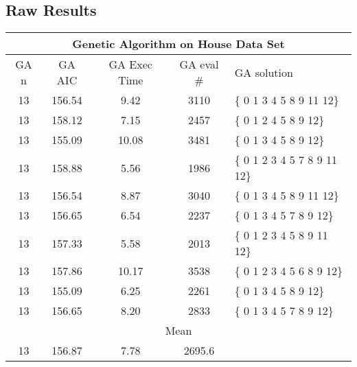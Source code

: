 \subsection{Raw Results}
\label{rawResHouse}
\begin{tabular}{|c|c|c|c|l|}
	\hline
	\multicolumn{5}{|c|}{Genetic Algorithm on House Data Set}                                     \\ \hline
	GA n & GA AIC      & GA Exec Time & GA eval \# & GA solution                  \\ \hline
	13   & 156.54 & 9.42             & 3110                  & \{ 0 1 3 4 5 8 9 11 12\}     \\ \hline
	13   & 158.12  & 7.15             & 2457                  & \{ 0 1 2 4 5 8 9 12\}        \\ \hline
	13   & 155.09 & 10.08            & 3481                  & \{ 0 1 3 4 5 8 9 12\}        \\ \hline
	13   & 158.88 & 5.56             & 1986                  & \{ 0 1 2 3 4 5 7 8 9 11 12\} \\ \hline
	13   & 156.54 & 8.87             & 3040                  & \{ 0 1 3 4 5 8 9 11 12\}     \\ \hline
	13   & 156.65 & 6.54             & 2237                  & \{ 0 1 3 4 5 7 8 9 12\}      \\ \hline
	13   & 157.33 & 5.58              & 2013                  & \{ 0 1 2 3 4 5 8 9 11 12\}   \\ \hline
	13   & 157.86 & 10.17             & 3538                  & \{ 0 1 2 3 4 5 6 8 9 12\}    \\ \hline
	13   & 155.09 & 6.25             & 2261                  & \{ 0 1 3 4 5 8 9 12\}        \\ \hline
	13   & 156.65 & 8.20             & 2833                  & \{ 0 1 3 4 5 7 8 9 12\}      \\ \hline
	\multicolumn{5}{|c|}{Mean}                                                                    \\ \hline
	13   & 156.87  & 7.78            & 2695.6                &                              \\ \hline
\end{tabular}

